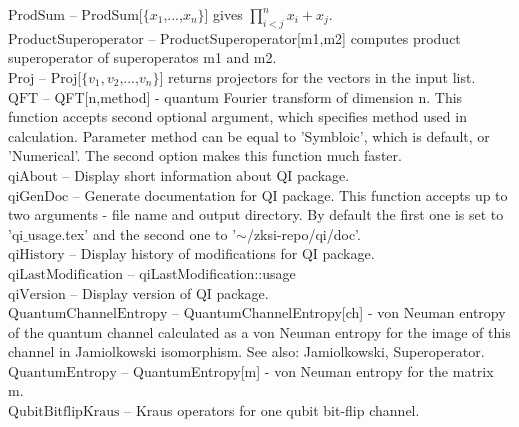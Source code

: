 \documentclass[a4paper,10pt]{scrartcl}
\begin{document}
\textbf{$ \text{ProdSum} $ }-- ProdSum[$\{$$ x_1 $,...,$ x_n $$\}$] gives $ \prod _{i<j}^nx_i+x_j. $\\

\textbf{$ \text{ProductSuperoperator} $ }-- ProductSuperoperator[m1,m2] computes product superoperator of superoperatos m1 and m2.$  $\\

\textbf{$ \text{Proj} $ }-- Proj[$\{$$ v_1,v_2 $,...,$ v_n $$\}$] returns projectors for the vectors in the input list.$  $\\

\textbf{$ \text{QFT} $ }-- QFT[n,method] - quantum Fourier transform of dimension n. This function accepts second optional argument, which specifies method used in calculation. Parameter method can be equal to 'Symbloic', which is default, or 'Numerical'. The second option makes this function much faster.$  $\\

\textbf{$ \text{qiAbout} $ }-- Display short information about QI package.$  $\\

\textbf{$ \text{qiGenDoc} $ }-- Generate documentation for QI package. This function accepts up to two arguments - file name and output directory. By default the first one is set to 'qi$\_$usage.tex' and the second one to '$\sim $/zksi-repo/qi/doc'.$  $\\

\textbf{$ \text{qiHistory} $ }-- Display history of modifications for QI package.$  $\\

\textbf{$ \text{qiLastModification} $ }-- qiLastModification$ \text{::} $usage$  $\\

\textbf{$ \text{qiVersion} $ }-- Display version of QI package.$  $\\

\textbf{$ \text{QuantumChannelEntropy} $ }-- QuantumChannelEntropy[ch] - von Neuman entropy of the quantum channel calculated as a von Neuman entropy for the image of this channel in Jamiolkowski isomorphism. See also: Jamiolkowski, Superoperator.$  $\\

\textbf{$ \text{QuantumEntropy} $ }-- QuantumEntropy[m] - von Neuman entropy for the matrix m.$  $\\

\textbf{$ \text{QubitBitflipKraus} $ }-- Kraus operators for one qubit bit-flip channel.$  $\\
\end{document}

